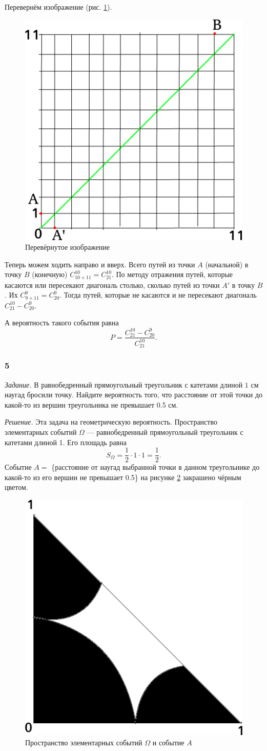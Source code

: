 Перевернём изображение (рис. \ref{fig:141}).

\begin{figure}[h!]
  \centering
  \includegraphics[width=.4\textwidth]{./pictures/t1v1_41.png}
  \caption{Перевёрнутое изображение}
  \label{fig:141}
\end{figure}

Теперь можем ходить направо и вверх.
Всего путей из точки $A$ (начальной) в точку $B$ (конечную) $C_{10+11}^{10} = C_{21}^{10}$.
По методу отражения путей, которые касаются или пересекают диагональ столько, сколько путей из точки $A'$ в точку $B$.
Их $C_{9+11}^9 = C_{20}^9$.
Тогда путей, которые не касаются и не пересекают диагональ $C_{21}^{10} - C_{20}^9$.

А вероятность такого события равна
$$P =
\frac{C_{21}^{10} - C_{20}^9}{C_{21}^{10}}.$$

\subsubsection*{5}

\textit{Задание.} В равнобедренный прямоугольный треугольник с катетами длиной $1$ см наугад бросили точку.
Найдите вероятность того, что расстояние от этой точки до какой-то из вершин треугольника не превышает 0.5 см.

\textit{Решение.} Эта задача на геометрическую вероятность.
Пространство элементарных событий $ \Omega $ --- равнобедренный прямоугольный треугольник с катетами длиной 1.
Его площадь равна
$$S_{ \Omega } =
\frac{1}{2} \cdot 1 \cdot 1 =
\frac{1}{2}.$$
Событие $A =$ \{расстояние от наугад выбранной точки в данном треугольнике до какой-то из его вершин не превышает 0.5\} на рисунке \ref{fig:5} закрашено чёрным цветом.

\begin{figure}[h!]
  \centering
  \includegraphics[width=.4\textwidth]{./pictures/t1v1_5.png}
  \caption{Пространство элементарных событий $ \Omega $ и событие $A$}
  \label{fig:5}
\end{figure}

